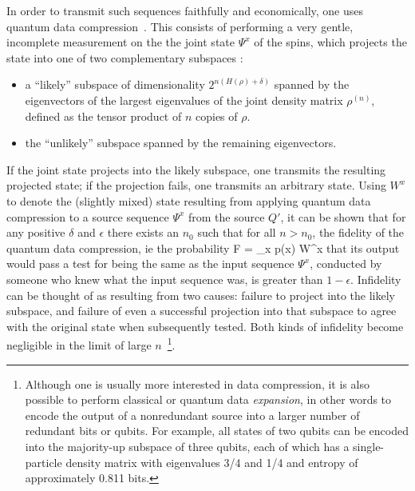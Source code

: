 In order to transmit such sequences faithfully and economically,
one uses quantum data compression~\cite{JS94,Schu95}.  This consists of
performing a very gentle, incomplete measurement on the the joint state
$\Psi^x$ of the spins, which projects the state into one of two complementary
subspaces :
 \begin{itemize}
 \item a ``likely'' subspace of
dimensionality $2^{n(H(\rho)+\delta)}$ spanned by the eigenvectors of
the largest eigenvalues of the joint density matrix $\rho^{(n)}$, defined
as the tensor product of $n$ copies of $\rho$.
 \item the ``unlikely'' subspace spanned by the remaining eigenvectors.
\end{itemize}\noindent
If the joint state projects into the likely
subspace, one transmits the resulting projected state; if the
projection fails, one transmits an arbitrary state.  Using $W^x$ to
denote the (slightly mixed) state resulting from applying quantum data
compression to a source sequence $\Psi^x$ from the source $Q'$, it
can be shown that  for any positive $\delta$ and $\epsilon$ there exists
an $n_0$ such that for all $n>n_0$, the fidelity of the quantum
data compression, ie the probability
 \beq
 F = \sum_x p(x) W^x
 \eeq that its output would pass a test for being the same as the input
sequence $\Psi^x$, conducted by someone who knew what the input sequence
was, is greater than $1-\epsilon$. Infidelity can be thought of as
resulting from two causes: failure to project into the likely subspace,
and failure of even a successful projection into that subspace to agree
with the original state when subsequently tested.  Both kinds of
infidelity become negligible in the limit of large
$n$~\footnote{Although one is usually more interested in data
compression, it is also possible to perform classical or quantum data
{\em expansion\/}, in other words to encode the output of a nonredundant
source into a larger number of redundant bits or qubits. For example,
all states of two qubits can be encoded into the majority-up subspace
of three qubits, each of which has a single-particle density matrix with
eigenvalues 3/4 and 1/4 and entropy of approximately 0.811 bits.}.
 
